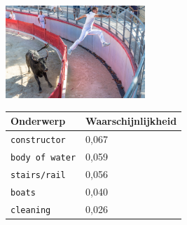 \begin{figure}
\begin{subfigure}{\textwidth}
    \centering
    \begin{minipage}[t][3.5cm]{.5\linewidth}
    \centering
    \vspace{0pt}
    \includegraphics[height=3.5cm]{Images/LDA/7446693604.jpg}
    \end{minipage}\hfill
    \begin{minipage}[t]{.5\textwidth}
    \centering
    \vspace{0pt}
    \begin{tabular}{ll}
            Onderwerp                           & Waarschijnlijkheid\\
            \hline
            \texttt{constructor}             & 0,067 \\
            \texttt{body of water}                   & 0,059 \\
            \texttt{stairs/rail}                 & 0,056 \\
            \texttt{boats}           & 0,040 \\
            \texttt{cleaning}        & 0,026\\
            \hline
        \end{tabular}
    \end{minipage}
\end{subfigure}

\vspace*{4mm}


\end{figure}
